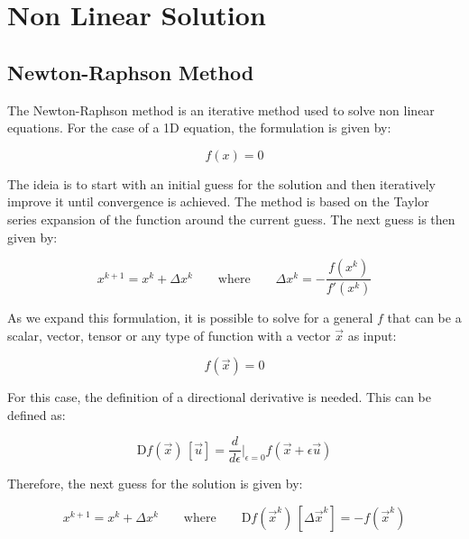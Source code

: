 \chapter{Non Linear Solution}

\section{Newton-Raphson Method}

The Newton-Raphson method is an iterative method used to solve non linear equations. For the case of a 1D equation, the formulation is given by:

\begin{equation*}
    f(x) = 0
\end{equation*}

The ideia is to start with an initial guess for the solution and then iteratively improve it until convergence is achieved. The method is based on the Taylor series expansion of the function around the current guess. The next guess is then given by:

\begin{equation} \label{eq:newton-raphson-1d}
    x^{k+1} = x^k + \Delta x^k \qquad \text{where} \qquad \Delta x^k = -\frac{f(x^k)}{f'(x^k)}
\end{equation}

As we expand this formulation, it is possible to solve for a general $f$ that can be a scalar, vector, tensor or any type of function with a vector $\vec{x}$ as input:

\begin{equation*}
    f \left(\vec{x} \right) = 0
\end{equation*}

For this case, the definition of a directional derivative is needed. This can be defined as:

\begin{equation} \label{eq:directional-der}
    \mathrm{D} f \left( \vec{x} \right) \, \left[\vec{u} \right] = \frac{d}{d \epsilon} \Bigr \rvert_{\epsilon = 0} f \left(\vec{x} + \epsilon \vec{u} \right)
\end{equation}

Therefore, the next guess for the solution is given by:

\begin{equation} \label{eq:newton-raphson}
    x^{k+1} = x^k + \Delta x^k \qquad \text{where} \qquad \mathrm{D} f \left( \vec{x}^k \right) \, \left[\Delta \vec{x}^k \right] = -f \left(\vec{x}^k \right)
\end{equation}

